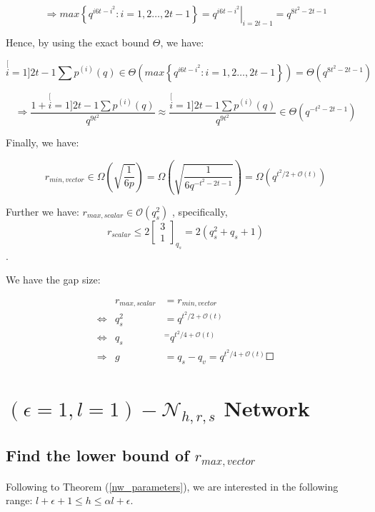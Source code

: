 \[
\Rightarrow max\left\{ q^{i6t-i^{2}}:i=1,2\ldots,2t-1\right\} =\left.q^{i6t-i^{2}}\right|_{i=2t-1}=q^{8t^{2}-2t-1}
\]

Hence, by using the exact bound $\Theta$, we have:

\[
\stackrel[i=1]{2t-1}{\mathop{\sum}}p^{(i)}(q)\in\Theta\left(max\left\{ q^{i6t-i^{2}}:i=1,2\ldots,2t-1\right\} \right)=\Theta\left(q^{8t^{2}-2t-1}\right)
\]

\[
\Rightarrow\frac{1+\stackrel[i=1]{2t-1}{\mathop{\sum}}p^{(i)}(q)}{q^{9t^{2}}}\approx\frac{\stackrel[i=1]{2t-1}{\mathop{\sum}}p^{(i)}(q)}{q^{9t^{2}}}\in\Theta\left(q^{-t^{2}-2t-1}\right)
\]

Finally, we have:

\[
r_{min,vector}\in\Omega\left(\sqrt{\frac{1}{6p}}\right)=\Omega\left(\sqrt{\frac{1}{6q^{-t^{2}-2t-1}}}\right)=\Omega\left(q^{t^{2}/2+\mathcal{O}\left(t\right)}\right)
\]

Further we have: $r_{max,scalar}\in\mathcal{O}\left(q_{s}^{2}\right)$
\cite{Wachter-Zeh:2018}, specifically, 
\begin{equation}
r_{scalar}\leq2\left[\begin{array}{c}
3\\
1
\end{array}\right]_{q_{s}}=2\left(q_{s}^{2}+q_{s}+1\right)\label{eq:r_scalar_max}
\end{equation}
. 

We have the gap size:

\begin{eqnarray*}
 & r_{max,scalar} & =r_{min,vector}\\
\Leftrightarrow & q_{s}^{2} & =q^{t^{2}/2+\mathcal{O}(t)}\\
\Leftrightarrow & q_{s} & ^{=}q^{t^{2}/4+\mathcal{O}(t)}\\
\Rightarrow & g & =q_{s}-q_{v}=q^{t^{2}/4+\mathcal{O}(t)}\Square
\end{eqnarray*}


\section{$\left(\epsilon=1,l=1\right)-\mathcal{N}_{h,r,s}$ Network}

\subsection{Find the lower bound of $r_{max,vector}$}

Following to Theorem (\ref{nw_parameters}), we are interested in
the following range: $l+\epsilon+1\leq h\leq\alpha l+\epsilon$.

